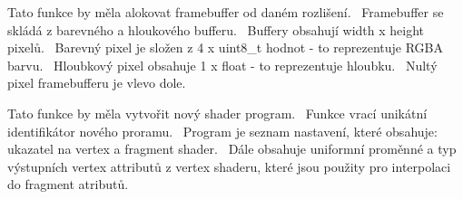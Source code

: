\begin{DoxyRefList}
\item[\label{todo__todo000028}%
\Hypertarget{todo__todo000028}%
Global \hyperlink{group__framebuffer__tasks_gab041c171fc07011d13ec608fc94a1d1c}{G\+PU\+:\+:create\+Framebuffer} (uint32\+\_\+t width, uint32\+\_\+t height)]Tato funkce by měla alokovat framebuffer od daném rozlišení.~\newline
 Framebuffer se skládá z barevného a hloukového bufferu.~\newline
 Buffery obsahují width x height pixelů.~\newline
 Barevný pixel je složen z 4 x uint8\+\_\+t hodnot -\/ to reprezentuje R\+G\+BA barvu.~\newline
 Hloubkový pixel obsahuje 1 x float -\/ to reprezentuje hloubku.~\newline
 Nultý pixel framebufferu je vlevo dole.~\newline
  
\item[\label{todo__todo000017}%
\Hypertarget{todo__todo000017}%
Global \hyperlink{group__program__tasks_gae1368a616ba5be607b9cf4dd1e60dfe0}{G\+PU\+:\+:create\+Program} ()]Tato funkce by měla vytvořit nový shader program.~\newline
 Funkce vrací unikátní identifikátor nového proramu.~\newline
 Program je seznam nastavení, které obsahuje\+: ukazatel na vertex a fragment shader.~\newline
 Dále obsahuje uniformní proměnné a typ výstupních vertex attributů z vertex shaderu, které jsou použity pro interpolaci do fragment atributů.~\newline
  

\end{DoxyRefList}
